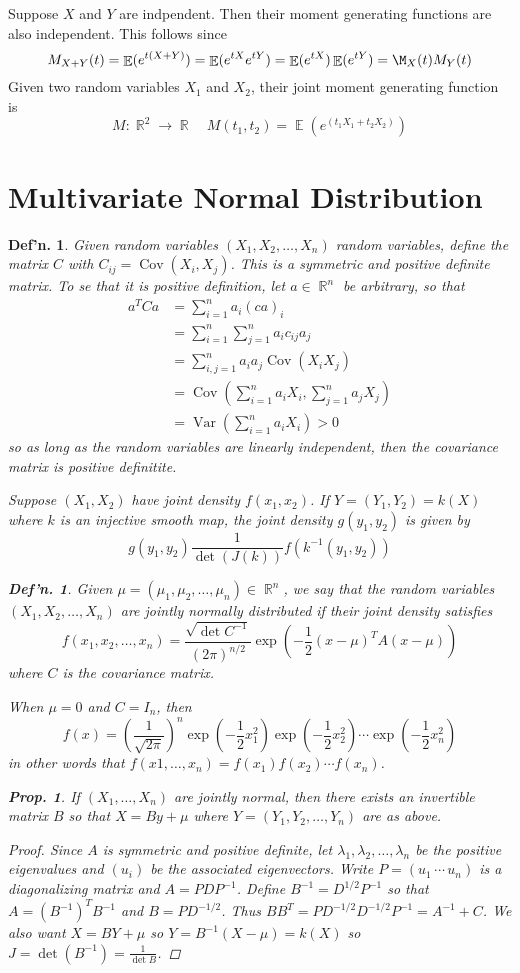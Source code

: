 \documentclass[12pt, a4paper]{book}
\DeclareMathOperator{\R}{\mathbb{R}}
\DeclareMathOperator{\E}{\mathbb{E}}
\DeclareMathOperator{\Var}{Var}
\DeclareMathOperator{\Cov}{Cov}
\newtheorem{definition}[theorem]{Def'n.}
\newtheorem{proposition}[theorem]{Prop.}
\theoremstyle{nonumberplain}
\newtheorem{proof}{Proof}
\begin{document}
Suppose $X$ and $Y$ are indpendent.
Then their moment generating functions are also independent.
This follows since
\[M_{X+Y}(t)=\E(e^{t(X+Y)})=\E(e^{tX}e^{tY})=\E(e^{tX})\E(e^{tY})=\M_X(t)M_Y(t)\]
Given two random variables $X_1$ and $X_2$, their joint moment generating function is
\[M:\R^2\to\R\quad M(t_1,t_2)=\E(e^{(t_1X_1+t_2X_2)})\]
\section{Multivariate Normal Distribution}
\begin{definition}
    Given random variables $(X_1,X_2,\ldots,X_n)$ random variables, define the matrix $C$ with $C_{ij}=\Cov(X_i,X_j)$.
    This is a symmetric and positive definite matrix.
To se that it is positive definition, let $a\in\R^n$ be arbitrary, so that
\begin{align*}
    a^TCa &= \sum\limits_{i=1}^n a_i(ca)_i\\
          &= \sum\limits_{i=1}^n\sum\limits_{j=1}^n a_i c_{ij}a_j\\
          &= \sum\limits_{i,j=1}^n a_i a_j\Cov(X_iX_j)\\
          &= \Cov\left(\sum\limits_{i=1}^n a_iX_i,\sum\limits_{j=1}^n a_jX_j\right)\\
          &= \Var\left(\sum\limits_{i=1}^n a_iX_i\right)>0
\end{align*}
so as long as the random variables are linearly independent, then the covariance matrix is positive definitite.

Suppose $(X_1,X_2)$ have joint density $f(x_1,x_2)$.
If $Y=(Y_1,Y_2)=k(X)$ where $k$ is an injective smooth map, the joint density $g(y_1,y_2)$ is given by
\[g(y_1,y_2)\frac{1}{\det(J(k))}f(k^{-1}(y_1,y_2))\]
\begin{definition}
    Given $\mu=(\mu_1,\mu_2,\ldots,\mu_n)\in\R^n$, we say that the random variables $(X_1,X_2,\ldots,X_n)$ are jointly normally distributed if their joint density satisfies
    \[f(x_1,x_2,\ldots,x_n) = \frac{\sqrt{\det C^{-1}}}{(2\pi)^{n/2}}\exp\left(-\frac{1}{2}(x-\mu)^TA(x-\mu)\right)\]
    where $C$ is the covariance matrix.
\end{definition}
When $\mu=0$ and $C=I_n$, then
\[f(x)=\left(\frac{1}{\sqrt{2\pi}}\right)^n\exp\left(-\frac{1}{2}x_1^2\right)\exp\left(-\frac{1}{2}x_2^2\right)\cdots\exp\left(-\frac{1}{2}x_n^2\right)\]
in other words that $f(x1,\ldots,x_n)=f(x_1)f(x_2)\cdots f(x_n)$.
\begin{proposition}
    If $(X_1,\ldots,X_n)$ are jointly normal, then there exists an invertible matrix $B$ so that $X=By+\mu$ where $Y=(Y_1,Y_2,\ldots,Y_n)$ are as above.
\end{proposition}
\begin{proof}
    Since $A$ is symmetric and positive definite, let $\lambda_1,\lambda_2,\ldots,\lambda_n$ be the positive eigenvalues and $(u_i)$ be the associated eigenvectors.
    Write $P=(u_1\,\cdots\, u_n)$ is a diagonalizing matrix and $A=PDP^{-1}$.
    Define $B^{-1}=D^{1/2}P^{-1}$ so that $A=(B^{-1})^TB^{-1}$ and $B=PD^{-1/2}$.
    Thus $BB^{T}=PD^{-1/2}D^{-1/2}P^{-1}=A^{-1}+C$.
    We also want $X=BY+\mu$ so $Y=B^{-1}(X-\mu)=k(X)$ so $J=\det(B^{-1})=\frac{1}{\det B}$.


\end{proof}
\end{definition}
\end{document}
